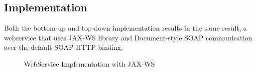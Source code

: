 \documentclass[a4paper, 11pt]{article}
\begin{document}
\subsection*{Implementation}
Both the bottom-up and top-down implementation results in the same result, a webservice that uses JAX-WS library and Document-style SOAP communication over the default SOAP-HTTP binding.
\begin{figure}[H]
  \begin{center}
    \caption{WebService Implementation with JAX-WS}
    \label{fig:fig}
  \end{center}
\end{figure}
\end{document}
